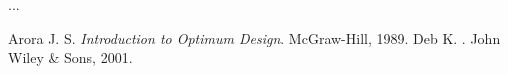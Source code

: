 \documentclass{report}
\begin{document}
	...
	\begin{thebibliography}{0000}
		Arora J. S. {\em Introduction to Optimum Design}. McGraw-Hill, 1989.
		\newblock Deb K.
		.
		\newblock John Wiley \& Sons, 2001.
	\end{thebibliography}
\end{document}
